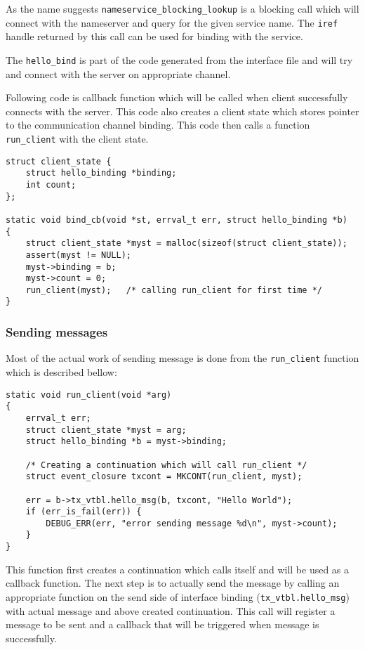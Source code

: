 As the name suggests  \texttt{nameservice\_blocking\_lookup} is a blocking
call which will connect with the nameserver and query for the given
service name.  The \texttt{iref} handle returned by this call can be used
for binding with the service.

The \texttt{hello\_bind} is part of the code generated from the interface
file and will try and connect with the server on appropriate channel.

Following code is callback function which will be called when client
successfully connects with the server.  This code also creates a client
state which stores pointer to the communication channel binding.  This code
then calls a function \texttt{run\_client} with the client state.


\begin{verbatim}
struct client_state {
    struct hello_binding *binding;
    int count;
};

static void bind_cb(void *st, errval_t err, struct hello_binding *b)
{
    struct client_state *myst = malloc(sizeof(struct client_state));
    assert(myst != NULL);
    myst->binding = b;
    myst->count = 0;
    run_client(myst);   /* calling run_client for first time */
}
\end{verbatim}


\subsubsection{Sending messages}

Most of the actual work of sending message is done from the \texttt{run\_client}
function which is described bellow:

\begin{verbatim}
static void run_client(void *arg)
{
    errval_t err;
    struct client_state *myst = arg;
    struct hello_binding *b = myst->binding;

    /* Creating a continuation which will call run_client */
    struct event_closure txcont = MKCONT(run_client, myst);

    err = b->tx_vtbl.hello_msg(b, txcont, "Hello World");
    if (err_is_fail(err)) {
        DEBUG_ERR(err, "error sending message %d\n", myst->count);
    }
}
\end{verbatim}

This function first creates a continuation which calls itself
and will be used as a callback function. The next step is to actually
send the message by calling an appropriate function on the send side of
interface binding (\texttt{tx\_vtbl.hello\_msg}) with actual message
and above created continuation.  This call will register a message to be sent
and a callback that will be triggered when message is successfully.

